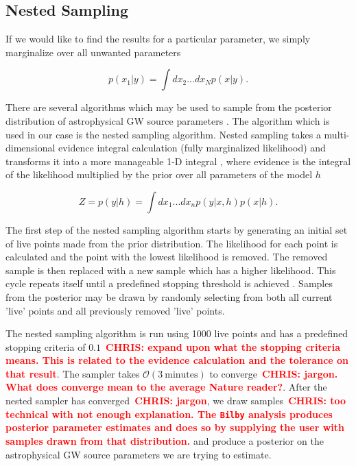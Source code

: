 \documentclass[%
showpacs,
 amsmath,amssymb,
 aps,
 twocolumn,
 prl,
 reprint,
floatfix,
]{revtex4-1}
\newcommand{\chris}[1]{\textbf{\textcolor{red}{CHRIS: #1}}}
\begin{document}
\subsection{Nested Sampling} \label{nested_sec}
%
%
If we would like to find the results for a particular parameter, 
we simply marginalize over all unwanted parameters 

\begin{equation}
    p(x_1|y) = \int dx_2 ... dx_N p(x|y).
\end{equation}

There are several algorithms which may be used to sample from the posterior
distribution of astrophysical GW source parameters \cite{PhysRevD.64.022001,
skilling2006,10.1111/j.1365-2966.2011.20288.x}. The
algorithm which is used in our case is the nested sampling algorithm. Nested
sampling takes a multi-dimensional evidence integral calculation (fully
marginalized likelihood) and transforms it into a more manageable 1-D integral
, where evidence is the integral of the likelihood 
multiplied by the prior over all parameters of the model $h$ ~\cite{1409.7215}

\begin{equation}
    Z = p(y|h) = \int dx_1 ... dx_n p(y|x,h)p(x|h).\label{eq:evidence}
\end{equation}

%
%
The first step of the nested sampling algorithm starts by generating an initial
set of live points made from the prior distribution. The likelihood for each
point is calculated and the point with the lowest likelihood is removed. The
removed sample is then replaced with a new sample which has a higher
likelihood. This cycle repeats itself until a predefined stopping threshold is
achieved \cite{1409.7215} . Samples from the posterior may be drawn by randomly
selecting from both all current 'live' points and all previously removed 'live'
points.

The nested sampling algorithm is run using
1000 live points and has a predefined stopping criteria of $0.1$~\chris{expand
upon what the stopping criteria means. This is related to the evidence
calculation and the tolerance on that result}. The sampler takes $\mathcal{O}(3
\: \textrm{minutes})$ to converge~\chris{jargon. What does converge mean to the
average Nature reader?}. After the nested sampler has converged~\chris{jargon}, we draw
samples~\chris{too technical with not enough explanation. The \texttt{Bilby} analysis
produces posterior parameter estimates and does so by supplying the user with
samples drawn from that distribution.} and produce a posterior on the
astrophysical \ac{GW} source parameters we are trying to estimate.
\end{document}
